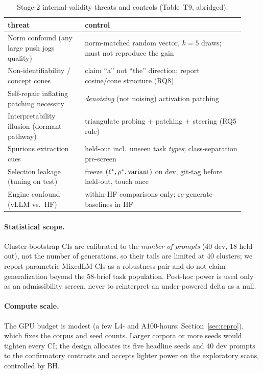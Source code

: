 \begin{table}[htbp]
\centering\footnotesize
\caption{Stage-2 internal-validity threats and controls (Table~T9, abridged).}
\label{tab:threats}
\begin{tabular}{@{}p{0.30\linewidth}p{0.62\linewidth}@{}}
\toprule
threat & control \\
\midrule
Norm confound (any large push jogs quality) & norm-matched random vector, $k{=}5$ draws; must not reproduce the gain \\
Non-identifiability / concept cones & claim ``a'' not ``the'' direction; report cosine/cone structure (RQ8) \\
Self-repair inflating patching necessity & \emph{denoising} (not noising) activation patching \\
Interpretability illusion (dormant pathway) & triangulate probing + patching + steering (RQ5 rule) \\
Spurious extraction cues & held-out incl.\ unseen task \emph{types}; class-separation pre-screen \\
Selection leakage (tuning on test) & freeze $(\ell^{*},\rho^{*},\text{variant})$ on dev, git-tag before held-out, touch once \\
Engine confound (vLLM vs.\ HF) & within-HF comparisons only; re-generate baselines in HF \\
\bottomrule
\end{tabular}
\end{table}

\paragraph{Statistical scope.} Cluster-bootstrap CIs are calibrated to the \emph{number of prompts}
(40 dev, 18 held-out), not the number of generations, so their tails are limited at 40 clusters; we
report parametric MixedLM CIs as a robustness pair and do not claim generalization beyond the 58-brief
task population. Post-hoc power is used only as an admissibility screen, never to reinterpret an
under-powered delta as a null.

\paragraph{Compute scale.} The GPU budget is modest (a few L4- and A100-hours; Section~\ref{sec:repro}),
which fixes the corpus and seed counts. Larger corpora or more seeds would tighten every CI; the design
allocates its five headline seeds and 40 dev prompts to the confirmatory contrasts and accepts lighter
power on the exploratory scans, controlled by BH.
